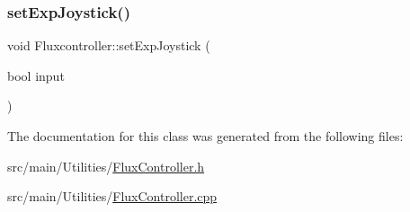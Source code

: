 \subsubsection{\texorpdfstring{set\+Exp\+Joystick()}{setExpJoystick()}}
{\footnotesize\ttfamily void Fluxcontroller\+::set\+Exp\+Joystick (\begin{DoxyParamCaption}\item[{bool}]{input }\end{DoxyParamCaption})}



The documentation for this class was generated from the following files\+:\begin{DoxyCompactItemize}
\item 
src/main/\+Utilities/\hyperlink{FluxController_8h}{Flux\+Controller.\+h}\item 
src/main/\+Utilities/\hyperlink{FluxController_8cpp}{Flux\+Controller.\+cpp}\end{DoxyCompactItemize}
